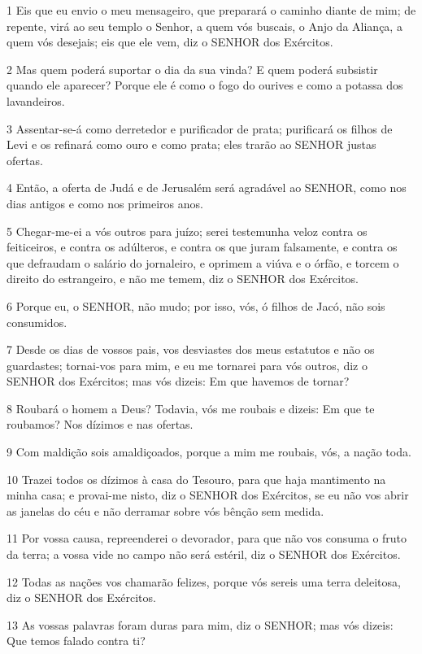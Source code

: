 \par 1 Eis que eu envio o meu mensageiro, que preparará o caminho diante de mim; de repente, virá ao seu templo o Senhor, a quem vós buscais, o Anjo da Aliança, a quem vós desejais; eis que ele vem, diz o SENHOR dos Exércitos.
\par 2 Mas quem poderá suportar o dia da sua vinda? E quem poderá subsistir quando ele aparecer? Porque ele é como o fogo do ourives e como a potassa dos lavandeiros.
\par 3 Assentar-se-á como derretedor e purificador de prata; purificará os filhos de Levi e os refinará como ouro e como prata; eles trarão ao SENHOR justas ofertas.
\par 4 Então, a oferta de Judá e de Jerusalém será agradável ao SENHOR, como nos dias antigos e como nos primeiros anos.
\par 5 Chegar-me-ei a vós outros para juízo; serei testemunha veloz contra os feiticeiros, e contra os adúlteros, e contra os que juram falsamente, e contra os que defraudam o salário do jornaleiro, e oprimem a viúva e o órfão, e torcem o direito do estrangeiro, e não me temem, diz o SENHOR dos Exércitos.
\par 6 Porque eu, o SENHOR, não mudo; por isso, vós, ó filhos de Jacó, não sois consumidos.
\par 7 Desde os dias de vossos pais, vos desviastes dos meus estatutos e não os guardastes; tornai-vos para mim, e eu me tornarei para vós outros, diz o SENHOR dos Exércitos; mas vós dizeis: Em que havemos de tornar?
\par 8 Roubará o homem a Deus? Todavia, vós me roubais e dizeis: Em que te roubamos? Nos dízimos e nas ofertas.
\par 9 Com maldição sois amaldiçoados, porque a mim me roubais, vós, a nação toda.
\par 10 Trazei todos os dízimos à casa do Tesouro, para que haja mantimento na minha casa; e provai-me nisto, diz o SENHOR dos Exércitos, se eu não vos abrir as janelas do céu e não derramar sobre vós bênção sem medida.
\par 11 Por vossa causa, repreenderei o devorador, para que não vos consuma o fruto da terra; a vossa vide no campo não será estéril, diz o SENHOR dos Exércitos.
\par 12 Todas as nações vos chamarão felizes, porque vós sereis uma terra deleitosa, diz o SENHOR dos Exércitos.
\par 13 As vossas palavras foram duras para mim, diz o SENHOR; mas vós dizeis: Que temos falado contra ti?

